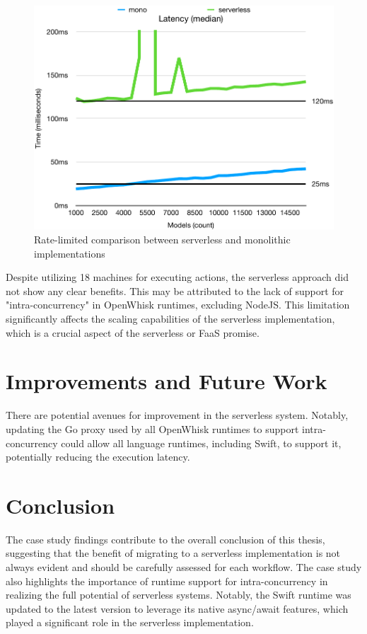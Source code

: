 \begin{figure}[h!]
    \centering
    \includegraphics[width=\textwidth]{rate_l70ms_latency_med.pdf}
    \caption{Rate-limited comparison between serverless and monolithic implementations}
    \label{fig:rate_limited_comparison}
\end{figure}

Despite utilizing 18 machines for executing actions, the serverless approach did not show any clear benefits. This may be attributed to the lack of support for "intra-concurrency" in OpenWhisk runtimes, excluding NodeJS. This limitation significantly affects the scaling capabilities of the serverless implementation, which is a crucial aspect of the serverless or FaaS promise.

\section{Improvements and Future Work}

There are potential avenues for improvement in the serverless system. Notably, updating the Go proxy used by all OpenWhisk runtimes to support intra-concurrency could allow all language runtimes, including Swift, to support it, potentially reducing the execution latency. 

\section{Conclusion}

The case study findings contribute to the overall conclusion of this thesis, suggesting that the benefit of migrating to a serverless implementation is not always evident and should be carefully assessed for each workflow. The case study also highlights the importance of runtime support for intra-concurrency in realizing the full potential of serverless systems. Notably, the Swift runtime was updated to the latest version to leverage its native async/await features, which played a significant role in the serverless implementation.



